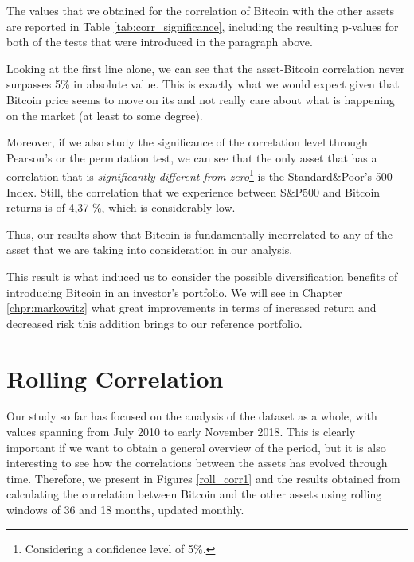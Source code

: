 The values that we obtained for the correlation of Bitcoin with the other assets are reported in Table \ref{tab:corr_significance}, including the resulting p-values for both of the tests that were introduced in the paragraph above.

Looking at the first line alone, we can see that the asset-Bitcoin correlation never surpasses 5\%  in absolute value. This is exactly what we would expect given that Bitcoin price seems to move on its and not really care about what is happening on the market (at least to some degree). 

Moreover, if we also study the significance of the correlation level through Pearson's or the permutation test, we can see that the only asset that has a correlation that is \textit{significantly different from zero}\footnote{Considering a confidence level of 5\%.} is the Standard\&Poor's 500 Index. Still, the correlation that we experience between S\&P500 and Bitcoin returns is of 4,37 \%, which is considerably low. 

Thus, our results show that Bitcoin is fundamentally incorrelated to any of the asset that we are taking into consideration in our analysis.

This result is what induced us to consider the possible diversification benefits of introducing  Bitcoin in an investor's portfolio. 
We will see in Chapter \ref{chpr:markowitz} what great improvements in terms of increased return and  decreased risk this addition brings to our reference portfolio. 





 \bigskip
\section{Rolling Correlation}
\label{sec:rolling_cor}
Our study so far has focused on the analysis of the dataset as a whole, with values spanning from  July 2010 to early November 2018. This is clearly  important if we want to obtain a general overview of the period, but it is also interesting to see how the correlations between the  assets has evolved through time. 
Therefore, we present in Figures \ref{roll_corr1} and the results obtained from calculating the correlation between Bitcoin and the other assets using  rolling windows of 36 and 18 months, updated monthly.



